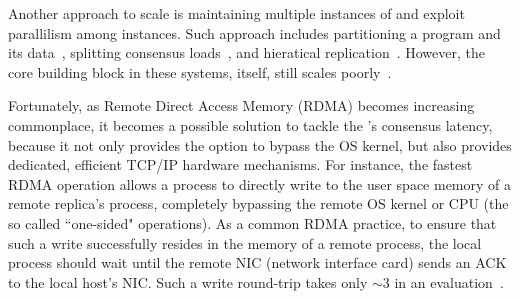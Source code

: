 Another approach to scale \paxos is maintaining multiple instances of \paxos 
and exploit parallilism among instances. Such approach includes partitioning a 
program and its data~\cite{scatter:sosp11,dssmr,ssmr}, splitting consensus 
loads~\cite{mencius:osdi08,spaxos}, and 
hieratical replication~\cite{manos:hotdep10,scatter:sosp11}. However, the core 
building block in these systems, \paxos itself, still scales 
poorly~\cite{ellis:thesis,scatter:sosp11}.





Fortunately, as Remote Direct Access Memory (RDMA) becomes increasing 
commonplace, it becomes a possible solution to tackle the \paxos's consensus 
latency, because it not only provides the option to bypass the OS kernel, but 
also provides dedicated, efficient TCP/IP hardware mechanisms. For instance, 
the fastest RDMA operation allows a process to directly write to the user space 
memory of a remote replica's process, completely bypassing the remote OS kernel 
or CPU (the so called ``one-sided" operations). As a common RDMA practice, to 
ensure that such a write successfully resides in the memory of a remote 
process, the local process should wait until the remote NIC (network interface 
card) sends an ACK to the local host's NIC. Such a write round-trip takes only 
$\sim$3 \us in an evaluation~\cite{pilaf:usenix14}.


